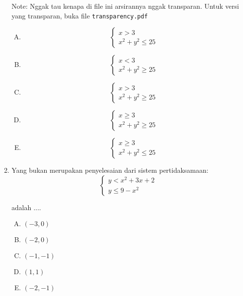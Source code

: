 \documentclass[fleqn, a4paper, 12pt]{article} %
\begin{document}
\begin{enumerate}
			Note: Nggak tau kenapa di file ini arsirannya nggak transparan. Untuk versi yang transparan, buka file \verb|transparency.pdf|
			
		\begin{enumerate}[(A)]
			\item \[\left\{\begin{array}{l}
					x > 3	\\
					x^2 + y^2 \leq 25	
				\end{array}\right.\]
			\item \[\left\{\begin{array}{l}
					x < 3	\\
					x^2 + y^2 \geq 25	
				\end{array}\right.\]
			\item \[\left\{\begin{array}{l}
					x > 3	\\
					x^2 + y^2 \geq 25	
				\end{array}\right.\]
			\item \[\left\{\begin{array}{l}
					x \geq 3	\\
					x^2 + y^2 \geq 25	
				\end{array}\right.\]
			\item \[\left\{\begin{array}{l}
					x \geq 3	\\
					x^2 + y^2 \leq 25	
				\end{array}\right.\]
				
		\newpage
		
		\end{enumerate}
		\item Yang bukan merupakan penyelesaian dari sistem pertidaksamaan:	\\
			\[\left\{\begin{array}{l}
					y < x^2 + 3x + 2	\\
					y \leq 9 - x^2	
				\end{array}\right.\]
				
			adalah ....
		\begin{enumerate}[(A)]
			\item $(-3, 0)$
			\item $(-2, 0)$
			\item $(-1, -1)$
			\item $(1, 1)$
			\item $(-2, -1)$
		\end{enumerate}
	\end{enumerate}
	
\end{document}
